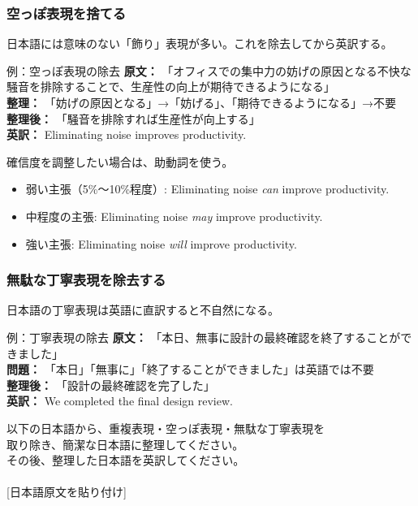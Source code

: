 \subsubsection{空っぽ表現を捨てる}

日本語には意味のない「飾り」表現が多い。これを除去してから英訳する。

\begin{itembox}[l]{例：空っぽ表現の除去}
\textbf{原文：} 「オフィスでの集中力の妨げの原因となる不快な騒音を排除することで、生産性の向上が期待できるようになる」\\
\textbf{整理：} 「妨げの原因となる」→「妨げる」、「期待できるようになる」→不要\\
\textbf{整理後：} 「騒音を排除すれば生産性が向上する」\\
\textbf{英訳：} Eliminating noise improves productivity.
\end{itembox}

確信度を調整したい場合は、助動詞を使う。
\begin{itemize}
\item 弱い主張（5\%〜10\%程度）: Eliminating noise \textit{can} improve productivity.
\item 中程度の主張: Eliminating noise \textit{may} improve productivity.
\item 強い主張: Eliminating noise \textit{will} improve productivity.
\end{itemize}

\subsubsection{無駄な丁寧表現を除去する}

日本語の丁寧表現は英語に直訳すると不自然になる。

\begin{itembox}[l]{例：丁寧表現の除去}
\textbf{原文：} 「本日、無事に設計の最終確認を終了することができました」\\
\textbf{問題：} 「本日」「無事に」「終了することができました」は英語では不要\\
\textbf{整理後：} 「設計の最終確認を完了した」\\
\textbf{英訳：} We completed the final design review.
\end{itembox}

\begin{promptbox}
以下の日本語から、重複表現・空っぽ表現・無駄な丁寧表現を\\
取り除き、簡潔な日本語に整理してください。\\
その後、整理した日本語を英訳してください。\\
\\
{[}日本語原文を貼り付け{]}
\end{promptbox}

